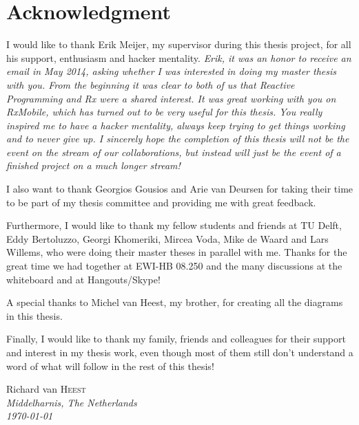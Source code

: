\chapter*{Acknowledgment}

I would like to thank Erik Meijer, my supervisor during this thesis project, for all his support, enthusiasm and hacker mentality. \textit{Erik, it was an honor to receive an email in May 2014, asking whether I was interested in doing my master thesis with you. From the beginning it was clear to both of us that Reactive Programming and Rx were a shared interest. It was great working with you on RxMobile, which has turned out to be very useful for this thesis. You really inspired me to have a hacker mentality, always keep trying to get things working and to never give up. I sincerely hope the completion of this thesis will not be the  event on the stream of our collaborations, but instead will just be the  event of a finished project on a much longer stream!}

I also want to thank Georgios Gousios and Arie van Deursen for taking their time to be part of my thesis committee and providing me with great feedback.

Furthermore, I would like to thank my fellow students and friends at TU Delft, Eddy Bertoluzzo, Georgi Khomeriki, Mircea Voda, Mike de Waard and Lars Willems, who were doing their master theses in parallel with me. Thanks for the great time we had together at EWI-HB 08.250 and the many discussions at the whiteboard and at Hangouts/Skype!

A special thanks to Michel van Heest, my brother, for creating all the diagrams in this thesis.

Finally, I would like to thank my family, friends and colleagues for their support and interest in my thesis work, even though most of them still don't understand a word of what will follow in the rest of this thesis!

\begin{flushright}
Richard van \textsc{Heest}\\
\textit{Middelharnis, The Netherlands}\\
\textit{\monthyeardate\today}
\end{flushright}